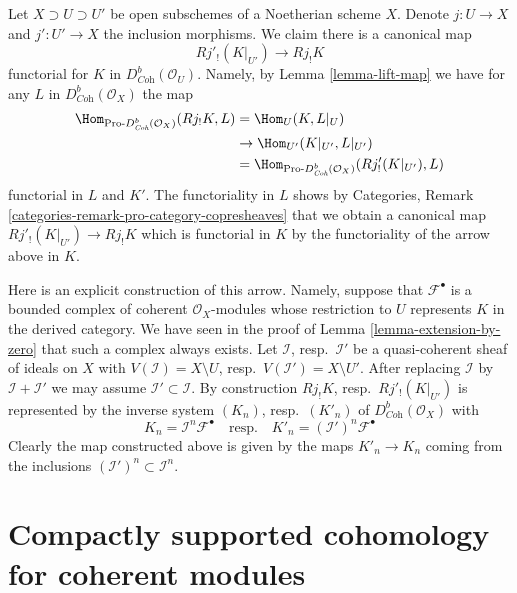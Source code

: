 \begin{remark}
\label{remark-covariance-open-j-lower-shriek}
Let $X \supset U \supset U'$ be open subschemes of a Noetherian scheme $X$.
Denote $j : U \to X$ and $j' : U' \to X$ the inclusion morphisms.
We claim there is a canonical map
$$
Rj'_!(K|_{U'}) \longrightarrow Rj_!K
$$
functorial for $K$ in $D^b_{\textit{Coh}}(\mathcal{O}_U)$. Namely, by
Lemma \ref{lemma-lift-map} we have for any $L$ in
$D^b_{\textit{Coh}}(\mathcal{O}_X)$ the map
\begin{align*}
\Hom_{\text{Pro-}D^b_{\textit{Coh}}(\mathcal{O}_X)}(Rj_!K, L)
& =
\Hom_U(K, L|_U) \\
& \to
\Hom_{U'}(K|_{U'}, L|_{U'}) \\
& =
\Hom_{\text{Pro-}D^b_{\textit{Coh}}(\mathcal{O}_X)}(Rj'_!(K|_{U'}), L)
\end{align*}
functorial in $L$ and $K'$. The functoriality in $L$ shows by
Categories, Remark \ref{categories-remark-pro-category-copresheaves}
that we obtain a canonical map $Rj'_!(K|_{U'}) \to Rj_!K$ which is
functorial in $K$ by the functoriality of the arrow above in $K$.

\medskip\noindent
Here is an explicit construction of this arrow. Namely, suppose
that $\mathcal{F}^\bullet$ is a bounded complex of coherent
$\mathcal{O}_X$-modules whose restriction to $U$ represents $K$
in the derived category. We have seen in the proof of
Lemma \ref{lemma-extension-by-zero}
that such a complex always exists. Let $\mathcal{I}$, resp.\ $\mathcal{I}'$
be a quasi-coherent sheaf of ideals on $X$ with
$V(\mathcal{I}) = X \setminus U$, resp.\ $V(\mathcal{I}') = X \setminus U'$.
After replacing $\mathcal{I}$ by $\mathcal{I} + \mathcal{I}'$
we may assume $\mathcal{I}' \subset \mathcal{I}$.
By construction $Rj_!K$, resp.\ $Rj'_!(K|_{U'})$ is represented by the
inverse system $(K_n)$, resp.\ $(K'_n)$ of $D^b_{\textit{Coh}}(\mathcal{O}_X)$
with
$$
K_n = \mathcal{I}^n\mathcal{F}^\bullet
\quad\text{resp.}\quad
K'_n = (\mathcal{I}')^n\mathcal{F}^\bullet
$$
Clearly the map constructed above is given by the maps
$K'_n \to K_n$ coming from the inclusions
$(\mathcal{I}')^n \subset \mathcal{I}^n$.
\end{remark}






\section{Compactly supported cohomology for coherent modules}
\label{section-compactly-supported}

